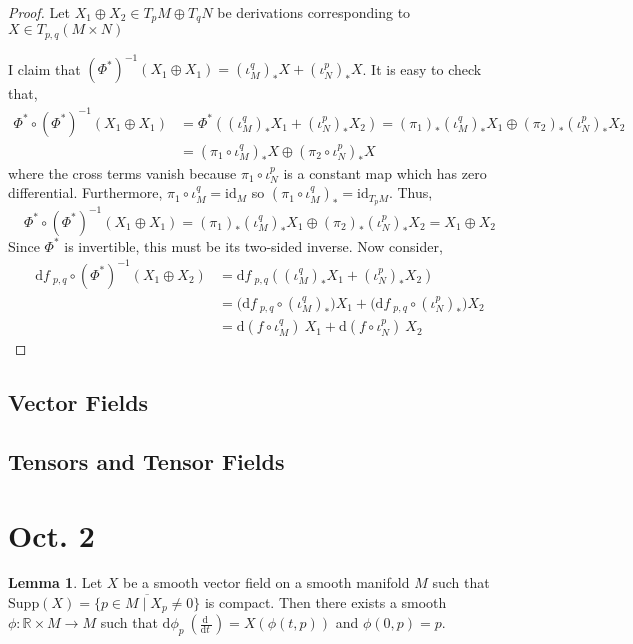 \documentclass[12pt]{extarticle}
\newcommand{\R}{\mathbb{R}}
\newcommand{\id}{\mathrm{id}}
\renewcommand{\d}[1]{ \mathrm{d}#1 \:}
\newcommand{\deriv}[2]{\frac{\d{#1}}{\d{#2}}}
\theoremstyle{definition}
\newtheorem{lemma}[theorem]{Lemma}
\begin{document}
\begin{proof}
Let $X_1 \oplus X_2 \in T_{p} M \oplus T_{q} N$ be derivations corresponding to $X \in T_{p,q}(M \times N)$ 

I claim that $(\Phi^*)^{-1}(X_1 \oplus X_1) = (\iota_M^q)_* X + (\iota_N^p)_* X$. It is easy to check that,
\begin{align*}
\Phi^* \circ (\Phi^*)^{-1}(X_1 \oplus X_1) & = \Phi^*((\iota_M^q)_* X_1 + (\iota_N^p)_* X_2) = (\pi_1)_* (\iota_M^q)_* X_1 \oplus (\pi_2)_* (\iota_N^p)_* X_2
\\
& = (\pi_1 \circ \iota_M^q)_* X \oplus (\pi_2 \circ \iota_N^p)_* X
\end{align*}
where the cross terms vanish because $\pi_1 \circ \iota_N^p$ is a constant map which has zero differential. Furthermore, $\pi_1 \circ \iota_M^q = \id_M$ so $(\pi_1 \circ \iota_M^q)_* = \id_{T_p M}$. Thus,
\[ \Phi^* \circ (\Phi^*)^{-1}(X_1 \oplus X_1) = (\pi_1)_* (\iota_M^q)_* X_1 \oplus (\pi_2)_* (\iota_N^p)_* X_2 = X_1 \oplus X_2 \]
Since $\Phi^*$ is invertible, this must be its two-sided inverse. Now consider,
\begin{align*}
\d{f}_{p,q} \circ (\Phi^*)^{-1}(X_1 \oplus X_2) & = \d{f}_{p,q}((\iota_M^q)_* X_1 + (\iota_N^p)_* X_2) 
\\
& = \big( \d{f}_{p,q} \circ (\iota_M^q)_* \big) X_1 + \big( \d{f}_{p,q} \circ (\iota_N^p)_* \big) X_2 
\\
& = \d{(f \circ \iota_M^q)} X_1 + \d{(f \circ \iota_N^p)} X_2
\end{align*}
\end{proof}


\subsection{Vector Fields}

\subsection{Tensors and Tensor Fields}

\section{Oct. 2}

\newcommand{\Supp}[1]{\mathrm{Supp}\left( #1 \right)}
\renewcommand{\L}{\mathcal{L}}

\begin{lemma}
Let $X$ be a smooth vector field on a smooth manifold $M$ such that $\Supp{X} = \overline{\{ p \in M \mid X_p \neq 0 \}}$ is compact. Then there exists a smooth $\phi : \R \times M \to M$ such that $\d{\phi_p}(\deriv{}{t}) = X(\phi(t, p))$ and $\phi(0, p) = p$. 
\end{lemma}
\end{document}

